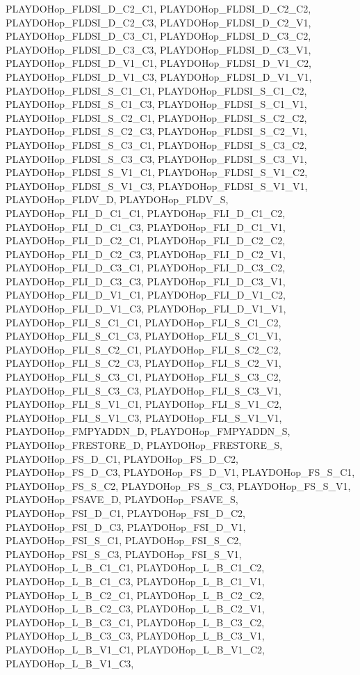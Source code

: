 PLAYDOHop\_\-FLDSI\_\-D\_\-C2\_\-C1, PLAYDOHop\_\-FLDSI\_\-D\_\-C2\_\-C2, PLAYDOHop\_\-FLDSI\_\-D\_\-C2\_\-C3, PLAYDOHop\_\-FLDSI\_\-D\_\-C2\_\-V1, PLAYDOHop\_\-FLDSI\_\-D\_\-C3\_\-C1, PLAYDOHop\_\-FLDSI\_\-D\_\-C3\_\-C2, PLAYDOHop\_\-FLDSI\_\-D\_\-C3\_\-C3, PLAYDOHop\_\-FLDSI\_\-D\_\-C3\_\-V1, PLAYDOHop\_\-FLDSI\_\-D\_\-V1\_\-C1, PLAYDOHop\_\-FLDSI\_\-D\_\-V1\_\-C2, PLAYDOHop\_\-FLDSI\_\-D\_\-V1\_\-C3, PLAYDOHop\_\-FLDSI\_\-D\_\-V1\_\-V1, PLAYDOHop\_\-FLDSI\_\-S\_\-C1\_\-C1, PLAYDOHop\_\-FLDSI\_\-S\_\-C1\_\-C2, PLAYDOHop\_\-FLDSI\_\-S\_\-C1\_\-C3, PLAYDOHop\_\-FLDSI\_\-S\_\-C1\_\-V1, PLAYDOHop\_\-FLDSI\_\-S\_\-C2\_\-C1, PLAYDOHop\_\-FLDSI\_\-S\_\-C2\_\-C2, PLAYDOHop\_\-FLDSI\_\-S\_\-C2\_\-C3, PLAYDOHop\_\-FLDSI\_\-S\_\-C2\_\-V1, PLAYDOHop\_\-FLDSI\_\-S\_\-C3\_\-C1, PLAYDOHop\_\-FLDSI\_\-S\_\-C3\_\-C2, PLAYDOHop\_\-FLDSI\_\-S\_\-C3\_\-C3, PLAYDOHop\_\-FLDSI\_\-S\_\-C3\_\-V1, PLAYDOHop\_\-FLDSI\_\-S\_\-V1\_\-C1, PLAYDOHop\_\-FLDSI\_\-S\_\-V1\_\-C2, PLAYDOHop\_\-FLDSI\_\-S\_\-V1\_\-C3, PLAYDOHop\_\-FLDSI\_\-S\_\-V1\_\-V1, PLAYDOHop\_\-FLDV\_\-D, PLAYDOHop\_\-FLDV\_\-S, PLAYDOHop\_\-FLI\_\-D\_\-C1\_\-C1, PLAYDOHop\_\-FLI\_\-D\_\-C1\_\-C2, PLAYDOHop\_\-FLI\_\-D\_\-C1\_\-C3, PLAYDOHop\_\-FLI\_\-D\_\-C1\_\-V1, PLAYDOHop\_\-FLI\_\-D\_\-C2\_\-C1, PLAYDOHop\_\-FLI\_\-D\_\-C2\_\-C2, PLAYDOHop\_\-FLI\_\-D\_\-C2\_\-C3, PLAYDOHop\_\-FLI\_\-D\_\-C2\_\-V1, PLAYDOHop\_\-FLI\_\-D\_\-C3\_\-C1, PLAYDOHop\_\-FLI\_\-D\_\-C3\_\-C2, PLAYDOHop\_\-FLI\_\-D\_\-C3\_\-C3, PLAYDOHop\_\-FLI\_\-D\_\-C3\_\-V1, PLAYDOHop\_\-FLI\_\-D\_\-V1\_\-C1, PLAYDOHop\_\-FLI\_\-D\_\-V1\_\-C2, PLAYDOHop\_\-FLI\_\-D\_\-V1\_\-C3, PLAYDOHop\_\-FLI\_\-D\_\-V1\_\-V1, PLAYDOHop\_\-FLI\_\-S\_\-C1\_\-C1, PLAYDOHop\_\-FLI\_\-S\_\-C1\_\-C2, PLAYDOHop\_\-FLI\_\-S\_\-C1\_\-C3, PLAYDOHop\_\-FLI\_\-S\_\-C1\_\-V1, PLAYDOHop\_\-FLI\_\-S\_\-C2\_\-C1, PLAYDOHop\_\-FLI\_\-S\_\-C2\_\-C2, PLAYDOHop\_\-FLI\_\-S\_\-C2\_\-C3, PLAYDOHop\_\-FLI\_\-S\_\-C2\_\-V1, PLAYDOHop\_\-FLI\_\-S\_\-C3\_\-C1, PLAYDOHop\_\-FLI\_\-S\_\-C3\_\-C2, PLAYDOHop\_\-FLI\_\-S\_\-C3\_\-C3, PLAYDOHop\_\-FLI\_\-S\_\-C3\_\-V1, PLAYDOHop\_\-FLI\_\-S\_\-V1\_\-C1, PLAYDOHop\_\-FLI\_\-S\_\-V1\_\-C2, PLAYDOHop\_\-FLI\_\-S\_\-V1\_\-C3, PLAYDOHop\_\-FLI\_\-S\_\-V1\_\-V1, PLAYDOHop\_\-FMPYADDN\_\-D, PLAYDOHop\_\-FMPYADDN\_\-S, PLAYDOHop\_\-FRESTORE\_\-D, PLAYDOHop\_\-FRESTORE\_\-S, PLAYDOHop\_\-FS\_\-D\_\-C1, PLAYDOHop\_\-FS\_\-D\_\-C2, PLAYDOHop\_\-FS\_\-D\_\-C3, PLAYDOHop\_\-FS\_\-D\_\-V1, PLAYDOHop\_\-FS\_\-S\_\-C1, PLAYDOHop\_\-FS\_\-S\_\-C2, PLAYDOHop\_\-FS\_\-S\_\-C3, PLAYDOHop\_\-FS\_\-S\_\-V1, PLAYDOHop\_\-FSAVE\_\-D, PLAYDOHop\_\-FSAVE\_\-S, PLAYDOHop\_\-FSI\_\-D\_\-C1, PLAYDOHop\_\-FSI\_\-D\_\-C2, PLAYDOHop\_\-FSI\_\-D\_\-C3, PLAYDOHop\_\-FSI\_\-D\_\-V1, PLAYDOHop\_\-FSI\_\-S\_\-C1, PLAYDOHop\_\-FSI\_\-S\_\-C2, PLAYDOHop\_\-FSI\_\-S\_\-C3, PLAYDOHop\_\-FSI\_\-S\_\-V1, PLAYDOHop\_\-L\_\-B\_\-C1\_\-C1, PLAYDOHop\_\-L\_\-B\_\-C1\_\-C2, PLAYDOHop\_\-L\_\-B\_\-C1\_\-C3, PLAYDOHop\_\-L\_\-B\_\-C1\_\-V1, PLAYDOHop\_\-L\_\-B\_\-C2\_\-C1, PLAYDOHop\_\-L\_\-B\_\-C2\_\-C2, PLAYDOHop\_\-L\_\-B\_\-C2\_\-C3, PLAYDOHop\_\-L\_\-B\_\-C2\_\-V1, PLAYDOHop\_\-L\_\-B\_\-C3\_\-C1, PLAYDOHop\_\-L\_\-B\_\-C3\_\-C2, PLAYDOHop\_\-L\_\-B\_\-C3\_\-C3, PLAYDOHop\_\-L\_\-B\_\-C3\_\-V1, PLAYDOHop\_\-L\_\-B\_\-V1\_\-C1, PLAYDOHop\_\-L\_\-B\_\-V1\_\-C2, PLAYDOHop\_\-L\_\-B\_\-V1\_\-C3, 